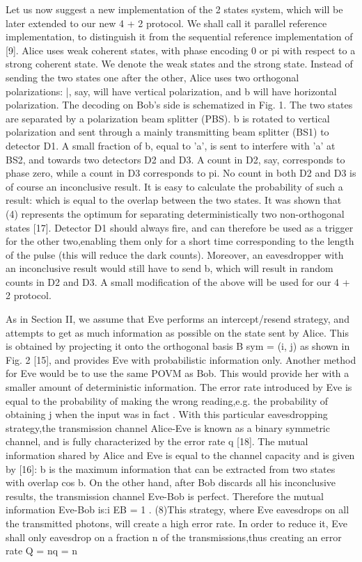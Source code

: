 Let us now suggest a new implementation of the 2 states system, which will be later extended to our new 4 + 2 protocol. We shall call it parallel reference implementation, to distinguish it from the sequential reference implementation of [9]. Alice uses weak coherent states, with phase encoding 0 or pi with respect to a strong coherent state. We denote the weak states  and the strong state. Instead of sending the two states one after the other, Alice uses two orthogonal polarizations: |, say, will have vertical polarization, and b will have horizontal polarization. The decoding on Bob’s side is schematized in Fig. 1. The two states are separated by a polarization beam splitter (PBS). b is rotated to vertical polarization and sent through a mainly transmitting beam splitter (BS1) to detector D1. A small fraction of b, equal to 'a', is sent to interfere with 'a' at BS2, and towards two detectors D2 and D3. A count in D2, say, corresponds to phase zero, while a count in D3 corresponds to pi. No count in both D2 and D3 is of course an inconclusive result. It is easy to calculate the probability of such a result: which is equal to the overlap between the two states. It was shown that (4) represents the optimum for separating deterministically two non-orthogonal states [17]. Detector D1 should always fire, and can therefore be used as a trigger for the other two,enabling them only for a short time corresponding to the length of the pulse (this will reduce the dark counts). Moreover, an eavesdropper with an inconclusive result would still have to send b, which will result in random counts in D2 and D3. A small modification of the above will be used for our 4 + 2 protocol.

As in Section II, we assume that Eve performs an intercept/resend strategy, and attempts to get as much information as possible on the state sent by Alice. This is obtained by projecting it onto the orthogonal basis B sym = (i, j) as shown in Fig. 2 [15], and provides Eve with probabilistic information only. Another method for Eve would be to use the same POVM as Bob. This would provide her with a smaller amount of deterministic information. The error rate introduced by Eve is equal to the probability of making the wrong reading,e.g. the probability of obtaining j when the input was in fact . With this particular eavesdropping strategy,the transmission channel Alice-Eve is known as a binary symmetric channel, and is fully characterized by the error rate q [18]. The mutual information shared by Alice and Eve is equal to the channel capacity and is given by [16]:
b is the maximum information that can be extracted from two states with overlap cos b. On the other hand, after Bob discards all his inconclusive results, the transmission channel Eve-Bob is perfect. Therefore the mutual information Eve-Bob is:i EB = 1 .
(8)This strategy, where Eve eavesdrops on all the transmitted photons, will create a high error rate. In order to reduce it, Eve shall only eavesdrop on a fraction n of the transmissions,thus creating an error rate Q = nq = n

